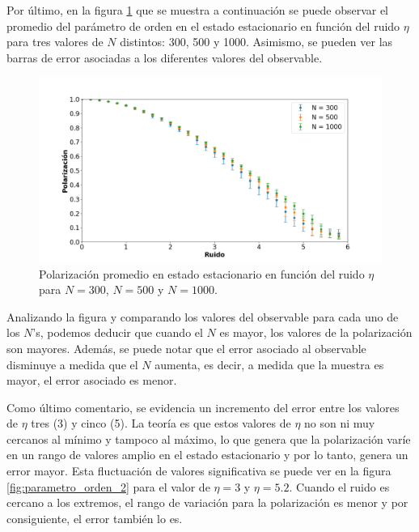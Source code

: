 \documentclass[11pt, a4paper]{article}
\begin{document}
            Por último, en la figura \ref{fig:parametro_orden_3} que se muestra a continuación se puede observar el promedio del parámetro de orden
            en el estado estacionario en función del ruido $\eta$ para tres valores de $N$ distintos: 300, 500 y 1000.
            Asimismo, se pueden ver las barras de error asociadas a los diferentes valores del observable.

            \begin{figure}[h]
                \centering
                \includegraphics[width=\textwidth]{./va_vs_eta}
                \caption{Polarización promedio en estado estacionario en función del ruido $\eta$ para $N=300$, $N=500$ y $N=1000$.}
                \label{fig:parametro_orden_3}
            \end{figure}

            Analizando la figura y comparando los valores del observable para cada uno de los $N$'s, podemos deducir que
            cuando el $N$ es mayor, los valores de la polarización son mayores. Además, se puede notar que el error asociado
            al observable disminuye a medida que el $N$ aumenta, es decir, a medida que la muestra es mayor, el error asociado
            es menor.

            Como último comentario, se evidencia un incremento del error entre los valores de $\eta$ tres (3) y cinco (5).
            La teoría es que estos valores de $\eta$ no son ni muy cercanos al mínimo y tampoco al máximo, lo que genera que
            la polarización varíe en un rango de valores amplio en el estado estacionario y por lo tanto, genera un error
            mayor. Esta fluctuación de valores significativa se puede ver en la figura \ref{fig:parametro_orden_2} para el valor de $\eta = 3$ y
            $\eta = 5.2$. Cuando el ruido es cercano a los extremos, el rango de variación para la polarización es menor y por
            consiguiente, el error también lo es.
\end{document}
